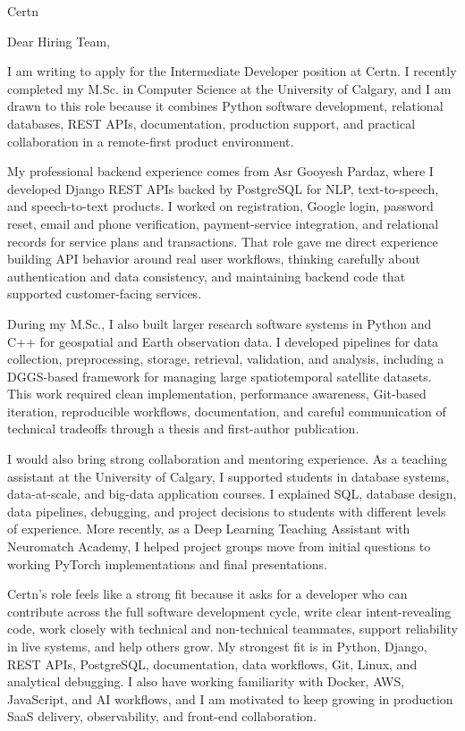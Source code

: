 \documentclass[11pt]{letter}
\begin{document}
\begin{letter}{Certn}

\opening{Dear Hiring Team,}

I am writing to apply for the Intermediate Developer position at Certn. I recently completed my M.Sc. in Computer Science at the University of Calgary, and I am drawn to this role because it combines Python software development, relational databases, REST APIs, documentation, production support, and practical collaboration in a remote-first product environment.

My professional backend experience comes from Asr Gooyesh Pardaz, where I developed Django REST APIs backed by PostgreSQL for NLP, text-to-speech, and speech-to-text products. I worked on registration, Google login, password reset, email and phone verification, payment-service integration, and relational records for service plans and transactions. That role gave me direct experience building API behavior around real user workflows, thinking carefully about authentication and data consistency, and maintaining backend code that supported customer-facing services.

During my M.Sc., I also built larger research software systems in Python and C++ for geospatial and Earth observation data. I developed pipelines for data collection, preprocessing, storage, retrieval, validation, and analysis, including a DGGS-based framework for managing large spatiotemporal satellite datasets. This work required clean implementation, performance awareness, Git-based iteration, reproducible workflows, documentation, and careful communication of technical tradeoffs through a thesis and first-author publication.

I would also bring strong collaboration and mentoring experience. As a teaching assistant at the University of Calgary, I supported students in database systems, data-at-scale, and big-data application courses. I explained SQL, database design, data pipelines, debugging, and project decisions to students with different levels of experience. More recently, as a Deep Learning Teaching Assistant with Neuromatch Academy, I helped project groups move from initial questions to working PyTorch implementations and final presentations.

Certn's role feels like a strong fit because it asks for a developer who can contribute across the full software development cycle, write clear intent-revealing code, work closely with technical and non-technical teammates, support reliability in live systems, and help others grow. My strongest fit is in Python, Django, REST APIs, PostgreSQL, documentation, data workflows, Git, Linux, and analytical debugging. I also have working familiarity with Docker, AWS, JavaScript, and AI workflows, and I am motivated to keep growing in production SaaS delivery, observability, and front-end collaboration.


\end{letter}
\end{document}
